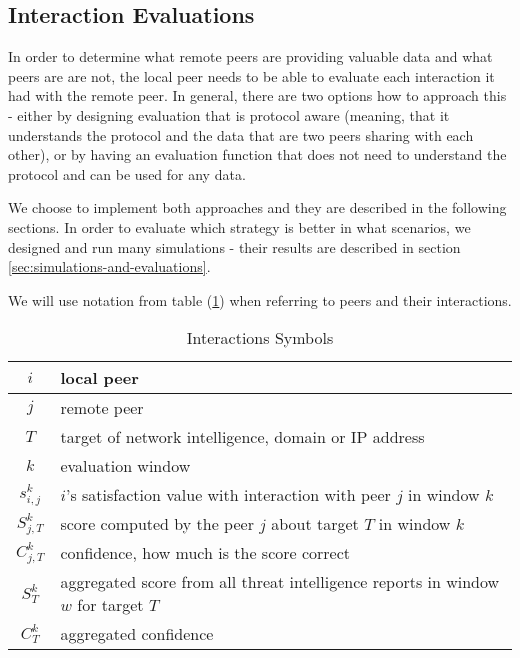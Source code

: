 \subsection{Interaction Evaluations}
\label{subsec:interaction-evaluation}
In order to determine what remote peers are providing valuable data and what peers are are not, the local peer needs to be able to evaluate each interaction it had with the remote peer.
In general, there are two options how to approach this - either by designing evaluation that is protocol aware (meaning, that it understands the protocol and the data that are two peers sharing with each other), or by having an evaluation function that does not need to understand the protocol and can be used for any data.

We choose to implement both approaches and they are described in the following sections. In order to evaluate which strategy is better in what scenarios, we designed and run many simulations - their results are described in section \ref{sec:simulations-and-evaluations}.

We will use notation from table (\ref{table:interaction-eval})  when referring to peers and their interactions.
\begin{table}[h!]
\centering
\begin{tabular}{ c | m{20em} }
 $i$ & local peer \\
 \hline
 $j$ & remote peer \\
 \hline
 $T$ & target of network intelligence, domain or IP address \\
 \hline
 $k$ & evaluation window \\
 \hline
 $s^{k}_{i, j}$ & $i$'s satisfaction value with interaction with peer $j$ in window $k$\\
 \hline
 $S^{k}_{j, T}$ & score computed by the peer $j$ about target $T$ in window $k$ \\
 \hline
 $C^{k}_{j, T}$ & confidence, how much is the score correct \\
 \hline
 $S^{k}_{T}$ & aggregated score from all threat intelligence reports in window $w$ for target $T$ \\
 \hline
 $C^{k}_{T}$ & aggregated confidence
\end{tabular}
\caption{Interactions Symbols}
\label{table:interaction-eval}
\end{table}


